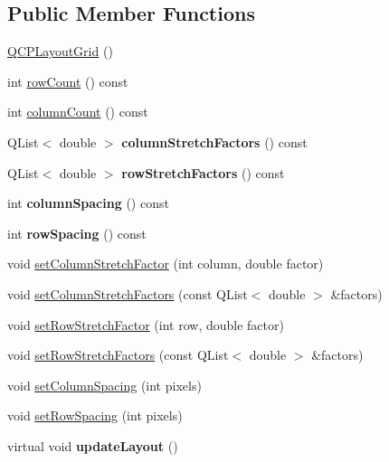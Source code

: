 \subsection*{\-Public \-Member \-Functions}
\begin{DoxyCompactItemize}
\item 
\hyperlink{classQCPLayoutGrid_ab2a4c1587dc8aed4c41c509c8d8d2a64}{\-Q\-C\-P\-Layout\-Grid} ()
\item 
int \hyperlink{classQCPLayoutGrid_af8e6c7a05864ebe610c87756c7b9079c}{row\-Count} () const 
\item 
int \hyperlink{classQCPLayoutGrid_ac39074eafd148b82d0762090f258189e}{column\-Count} () const 
\item 
\hypertarget{classQCPLayoutGrid_a39bd7994d00687d1b9defef6f1bda835}{\-Q\-List$<$ double $>$ {\bfseries column\-Stretch\-Factors} () const }\label{classQCPLayoutGrid_a39bd7994d00687d1b9defef6f1bda835}

\item 
\hypertarget{classQCPLayoutGrid_a3744496abf73c8e3b464181d63bb20a7}{\-Q\-List$<$ double $>$ {\bfseries row\-Stretch\-Factors} () const }\label{classQCPLayoutGrid_a3744496abf73c8e3b464181d63bb20a7}

\item 
\hypertarget{classQCPLayoutGrid_a3de19753fdca81194458cb15156f7315}{int {\bfseries column\-Spacing} () const }\label{classQCPLayoutGrid_a3de19753fdca81194458cb15156f7315}

\item 
\hypertarget{classQCPLayoutGrid_abccdd33c1b284feb6df90fa02f23d9a3}{int {\bfseries row\-Spacing} () const }\label{classQCPLayoutGrid_abccdd33c1b284feb6df90fa02f23d9a3}

\item 
void \hyperlink{classQCPLayoutGrid_ae38f31a71687b9d7ee3104852528fb50}{set\-Column\-Stretch\-Factor} (int column, double factor)
\item 
void \hyperlink{classQCPLayoutGrid_a6c2591d1a7e2534ce036989543b49e57}{set\-Column\-Stretch\-Factors} (const \-Q\-List$<$ double $>$ \&factors)
\item 
void \hyperlink{classQCPLayoutGrid_a7b0273de5369bd93d942edbaf5b166ec}{set\-Row\-Stretch\-Factor} (int row, double factor)
\item 
void \hyperlink{classQCPLayoutGrid_a200b45f9c908f96ebadaa3c8d87a2782}{set\-Row\-Stretch\-Factors} (const \-Q\-List$<$ double $>$ \&factors)
\item 
void \hyperlink{classQCPLayoutGrid_a3a49272aba32bb0fddc3bb2a45a3dba0}{set\-Column\-Spacing} (int pixels)
\item 
void \hyperlink{classQCPLayoutGrid_aaef2cd2d456197ee06a208793678e436}{set\-Row\-Spacing} (int pixels)
\item 
\hypertarget{classQCPLayoutGrid_a07f8dd7d3d61d7345026621d446042a4}{virtual void {\bfseries update\-Layout} ()}\label{classQCPLayoutGrid_a07f8dd7d3d61d7345026621d446042a4}


\end{DoxyCompactItemize}
